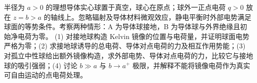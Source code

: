 半径为 \(a>0\) 的理想导体实心球置于真空，球心在原点；球外一正点电荷 \(q>0\) 放在 \(z=b>a\) 的轴线上。忽略辐射及导体材料微观效应，静电平衡时外部电势满足球面的等势条件。考察两种情形：A 为导体球接地，B 为导体球与外界绝缘且初始净电荷为零。
(1) 对接地球构造 Kelvin 镜像的位置与电荷量，并证明球面电势严格为零；(2) 求接地球诱导的总电荷、导体对点电荷的力及相互作用势能；(3) 对孤立中性球给出额外镜像构造，求外部电势、导体对点电荷的力，比较它与接地球的吸引强弱；(4) 讨论 \(b\gg a\) 与 \(b\to a^+\) 极限，并解释不能将镜像电荷作为真实可自由运动的点电荷处理。
